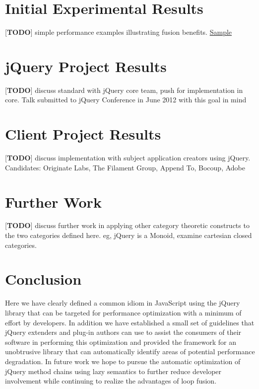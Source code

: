 \documentclass[preprint]{sigplanconf}
\begin{document}
\section{Initial Experimental Results}

[\textbf{TODO}] simple performance examples illustrating fusion benefits. \href{http://jsperf.com/lazy-loop-fusion-vs-traditional-method-chaning/5}{Sample}

\section{jQuery Project Results}

[\textbf{TODO}] discuss standard with jQuery core team, push for implementation in core. Talk submitted to jQuery Conference in June 2012 with this goal in mind

\section{Client Project Results}

[\textbf{TODO}] discuss implementation with subject application creators using jQuery. Candidates: Originate Labs, The Filament Group, Append To, Bocoup, Adobe

\section{Further Work}

[\textbf{TODO}] discuss further work in applying other category theoretic constructs to the two categories defined here. eg, jQuery is a Monoid, examine cartesian closed categories.

\section{Conclusion}

Here we have clearly defined a common idiom in JavaScript using the jQuery library that can be targeted for performance optimization with a minimum of effort by developers. In addition we have established a small set of guidelines that jQuery extenders and plug-in authors can use to assist the consumers of their software in performing this optimization and provided the framework for an unobtrusive library that can automatically identify areas of potential performance degradation. In future work we hope to pursue the automatic optimization of jQuery method chains using lazy semantics to further reduce developer involvement while continuing to realize the advantages of loop fusion.
\end{document}
